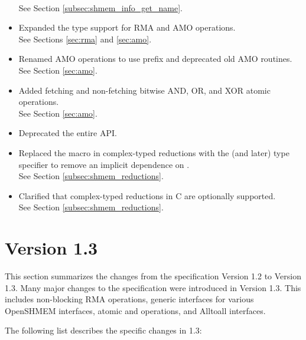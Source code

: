 \begin{itemize}
\\See Section \ref{subsec:shmem_info_get_name}.
%
\item Expanded the type support for RMA and AMO operations.
\\ See Sections \ref{sec:rma} and \ref{sec:amo}.
%
\item Renamed AMO operations to use  prefix and
      deprecated old AMO routines.
\\ See Section \ref{sec:amo}.
%
\item Added fetching and non-fetching bitwise AND, OR, and XOR atomic
      operations.
\\ See Section \ref{sec:amo}.
%
\item Deprecated the entire \Fortran API.
%
\item Replaced the  macro in complex-typed reductions with the
      \Cstd[99] (and later) type specifier  to remove an
      implicit dependence on .
\\ See Section \ref{subsec:shmem_reductions}.
%
\item Clarified that complex-typed reductions in C are optionally supported.
\\ See Section \ref{subsec:shmem_reductions}.
%
\end{itemize}

\section{Version 1.3}
This section summarizes the changes from the \openshmem specification Version
1.2 to Version 1.3. Many major changes to the specification were introduced in Version 1.3. This includes non-blocking RMA operations, 
generic interfaces for various OpenSHMEM interfaces, atomic  and  operations,  and Alltoall interfaces. 


The following list describes the specific changes in 1.3:

